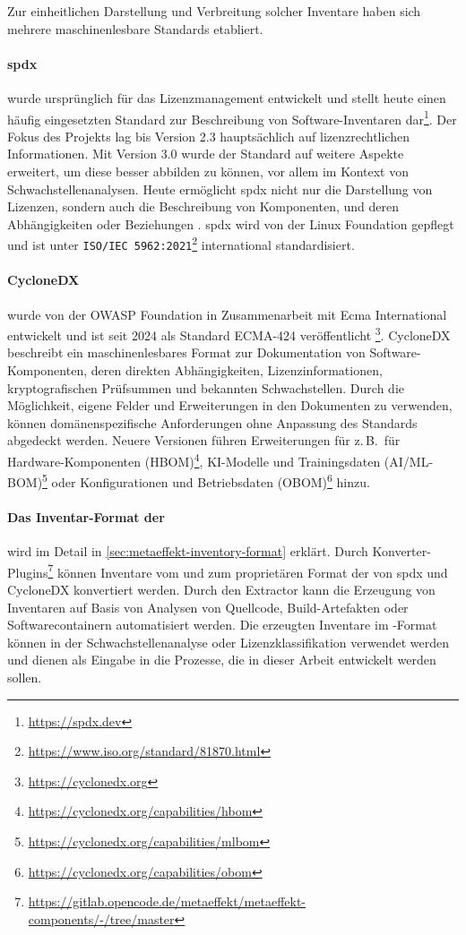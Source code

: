 Zur einheitlichen Darstellung und Verbreitung solcher Inventare haben sich mehrere maschinenlesbare Standards etabliert.

\paragraph{\acrfull{spdx}}
wurde ursprünglich für das Lizenzmanagement entwickelt und stellt heute einen häufig eingesetzten Standard zur Beschreibung von Software-Inventaren dar\footnote{\url{https://spdx.dev}}.
Der Fokus des Projekts lag bis Version 2.3 hauptsächlich auf lizenzrechtlichen Informationen.
Mit Version 3.0 wurde der Standard auf weitere Aspekte erweitert, um diese besser abbilden zu können, vor allem im Kontext von Schwachstellenanalysen.
Heute ermöglicht \acrshort{spdx} nicht nur die Darstellung von Lizenzen, sondern auch die Beschreibung von Komponenten, und deren Abhängigkeiten oder Beziehungen \autocite{spdxOverview1june2024}.
\acrshort{spdx} wird von der Linux Foundation gepflegt und ist unter \texttt{ISO/IEC 5962:2021}\footnote{\url{https://www.iso.org/standard/81870.html}} international standardisiert.

\paragraph{CycloneDX}
wurde von der OWASP Foundation in Zusammenarbeit mit Ecma International entwickelt und ist seit 2024 als Standard ECMA-424 veröffentlicht \autocite{CycloneDX2024Spec, ecma424:2024}\footnote{\url{https://cyclonedx.org}}.
CycloneDX beschreibt ein maschinenlesbares Format zur Dokumentation von Software-Komponenten, deren direkten Abhängigkeiten, Lizenzinformationen, kryptografischen Prüfsummen und bekannten Schwachstellen.
Durch die Möglichkeit, eigene Felder und Erweiterungen in den Dokumenten zu verwenden, können domänenspezifische Anforderungen ohne Anpassung des Standards abgedeckt werden.
Neuere Versionen führen Erweiterungen für z.\,B.\ für Hardware-Komponenten (HBOM)\footnote{\url{https://cyclonedx.org/capabilities/hbom}}, KI-Modelle und Trainingsdaten (AI/ML-BOM)\footnote{\url{https://cyclonedx.org/capabilities/mlbom}} oder Konfigurationen und Betriebsdaten (OBOM)\footnote{\url{https://cyclonedx.org/capabilities/obom}} hinzu.

\paragraph{Das Inventar-Format der \metaeffekt}
wird im Detail in \autoref{sec:metaeffekt-inventory-format} erklärt.
Durch Konverter-Plugins\footnote{\url{https://gitlab.opencode.de/metaeffekt/metaeffekt-components/-/tree/master}} können Inventare vom und zum proprietären Format der \metaeffektsp von \acrshort{spdx} und CycloneDX konvertiert werden.
Durch den \metaeffektsp Extractor kann die Erzeugung von Inventaren auf Basis von Analysen von Quellcode, Build-Artefakten oder Softwarecontainern automatisiert werden.
Die erzeugten Inventare im \metaeffekt-Format können in der Schwachstellenanalyse oder Lizenzklassifikation verwendet werden und dienen als Eingabe in die Prozesse, die in dieser Arbeit entwickelt werden sollen.

